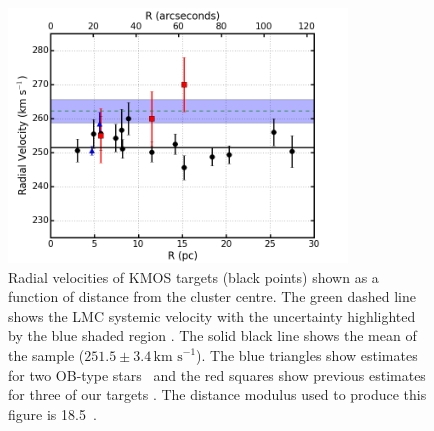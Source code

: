 \documentclass[useAMS,usenatbib]{mn2e}
\def\kms{$\mbox{km s}^{-1}$}
\begin{document}
\begin{figure}
 \includegraphics[width=9.0cm]{NGC2100-rv-v8}
 \caption{Radial velocities of KMOS targets (black points) shown as a function of distance from the cluster centre.
 The green dashed line shows the LMC systemic velocity with the uncertainty highlighted by the blue shaded region
 {\citep[$262.2\pm3.4$\,\kms;][]{2012AJ....144....4M}}.
 The solid black line shows the mean of the sample ($251.5\pm3.4\,$\kms).
 The blue triangles show estimates for two OB-type stars~\protect\citep{2015A&A...584A...5E} and the red squares show previous estimates for three of our targets
 {\citep{1994A&A...282..717J}}.
 The distance modulus used to produce this figure is 18.5~\citep{2013Natur.495...76P,2014AJ....147..122D}.
 \label{fig:rvs}}
\end{figure}
\end{document}
